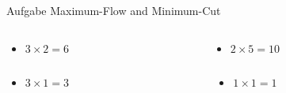 \begin{frame}[allowframebreaks]{Aufgabe \thesection}{Maximum-Flow and Minimum-Cut}
\begin{solution}
  \end{solution}
  \begin{solutionnoinc}
    \begin{columns}
      \begin{column}{0.5\textwidth}
        \begin{itemize}
          \item $3\times 2 = 6$
        \end{itemize}
      \end{column}
      \begin{column}{0.5\textwidth}
        \begin{itemize}
          \item $2\times 5 = 10$
        \end{itemize}
      \end{column}
    \end{columns}
  \end{solutionnoinc}
  \begin{solutionnoinc}
    \begin{columns}
      \begin{column}{0.5\textwidth}
        \begin{itemize}
          \item $3\times 1 = 3$
        \end{itemize}
      \end{column}
      \begin{column}{0.5\textwidth}
        \begin{itemize}
          \item $1\times 1 = 1$
        \end{itemize}
      \end{column}

\end{columns}
\end{solutionnoinc}
\end{frame}
